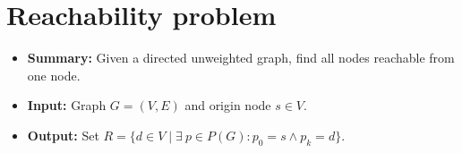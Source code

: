 \section{Reachability problem}
\begin{itemize}
    \item \textbf{Summary:} Given a directed unweighted graph, find all nodes reachable from one node.
    \item \textbf{Input:} Graph $G=(V,E)$ and origin node $s \in V$.
    \item \textbf{Output:} Set $R=\{d \in V \mid \exists~p \in P(G)\colon p_0 = s \wedge p_k = d\}$.
\end{itemize}

